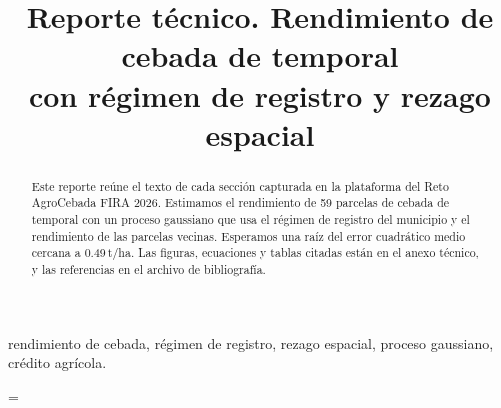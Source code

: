 \documentclass[conference,letterpaper]{IEEEtran}
\begin{document}
\title{Reporte técnico. Rendimiento de cebada de temporal\\con régimen de registro y rezago espacial}

\author{
\and
{}
\and
{}
\and
{}
}

\maketitle

\begin{abstract}
Este reporte reúne el texto de cada sección capturada en la plataforma del Reto AgroCebada
FIRA 2026. Estimamos el rendimiento de 59 parcelas de cebada de temporal con un proceso gaussiano que usa el régimen de
registro del municipio y el rendimiento de las parcelas vecinas. Esperamos una raíz del error cuadrático medio cercana
a 0.49\,t/ha. Las figuras, ecuaciones y tablas citadas están en el anexo técnico, y las referencias en el archivo de
bibliografía.
\end{abstract}

\begin{IEEEkeywords}
rendimiento de cebada, régimen de registro, rezago espacial, proceso gaussiano, crédito agrícola.
\end{IEEEkeywords}









=\vbox{}
\end{document}
